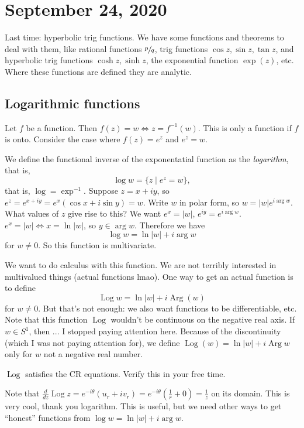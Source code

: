 \section{September 24, 2020}
Last time: hyperbolic trig functions. We have some functions and theorems to deal with them, like rational functions $\sfrac{p}{q}$, trig functions $\cos z, \sin z, \tan z$, and hyperbolic trig functions $\cosh z, \sinh z$, the exponential function $\exp(z)$, etc. Where these functions are defined they are analytic.
\subsection{Logarithmic functions}
Let $f$ be a function. Then $f(z)=w \iff z=f^{-1}(w)$. This is only a function if $f$ is onto. Consider the case where $f(z)=e^{z}$ and $e^{z}=w$. 
\begin{definition}[Logarithm]
    We define the functional inverse of the exponentatial function as the \emph{logarithm}, that is, \[
    \log w = \{z \mid e^z=w\},
    \] that is, $\log=\exp^{-1}$.
Suppose $z=x+iy$, so $e^z=e^{x+iy}=e^{x}(\cos x +i\sin y)=w$. Write $w$ in polar form, so $w=|w|e^{i\operatorname{arg}w}$. What values of $z$ give rise to this? We want $e^{x}=|w|$, $e^{iy}=e^{i\operatorname{arg}w}$. $e^{x}=|w|\iff x=\ln|w|$, so $y\in \operatorname{arg}w$. Therefore we have \[
    \log w=\ln|w|+i\operatorname{arg}w
\] for $w\neq 0$. So this function is multivariate.
\end{definition}
We want to do calculus with this function. We are not terribly interested in multivalued things (actual functions lmao). One way to get an actual function is to define \[
    \operatorname{Log}w=\ln|w|+i\operatorname{Arg}(w)
\] for $w\neq 0$. But that's not enough: we also want functions to be differentiable, etc. Note that this function $\operatorname{Log}$ wouldn't be continuous on the negative real axis. If $w\in S^{1} $, then ... I stopped paying attention here. Because of the discontinuity (which I was not paying attention for), we define $\operatorname{Log}(w)=\ln|w|+i\operatorname{Arg}w$ only for $w$ not a negative real number. 

\begin{claim}
    $\operatorname{Log}$ satisfies the CR equations. Verify this in your free time.
\end{claim}
Note that $\frac{d}{dz}\operatorname{Log}z=e^{-i\theta}(u_r+iv_r)=e^{-i\theta}(\frac{1}{r}+0)=\frac{1}{z}$ on its domain. This is very cool, thank you logarithm. This is useful, but we need other ways to get ``honest'' functions from $\log w=\ln|w|+i\operatorname{arg}w$.


